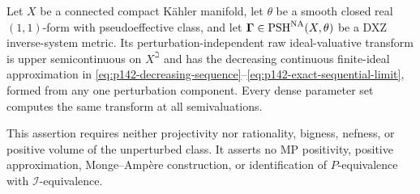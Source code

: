 \begin{corollary}\label{cor:p142-pseudoeffective-raw-usc}
Let $X$ be a connected compact K\"ahler manifold, let $\theta$ be a
smooth closed real $(1,1)$-form with pseudoeffective class, and let
$\boldsymbol\Gamma\in\operatorname{PSH}^{\mathrm{NA}}(X,\theta)$ be a DXZ
inverse-system metric. Its perturbation-independent raw ideal-valuative
transform is upper semicontinuous on $X^\beth$ and has the decreasing
continuous finite-ideal approximation in
\eqref{eq:p142-decreasing-sequence}--\eqref{eq:p142-exact-sequential-limit},
formed from any one perturbation component. Every dense parameter set
computes the same transform at all semivaluations.

This assertion requires neither projectivity nor rationality, bigness,
nefness, or positive volume of the unperturbed class. It asserts no MP
positivity, positive approximation, Monge--Amp\`ere construction, or
identification of $P$-equivalence with $\mathcal I$-equivalence.
\end{corollary}
